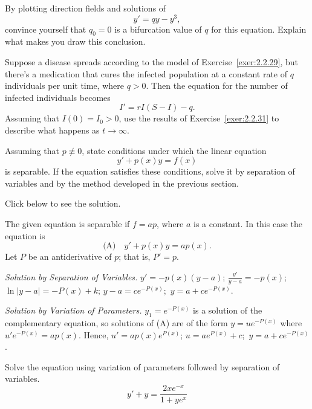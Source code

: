 \documentclass{ximera}
\begin{document}
\begin{problem}\label{exer:2.2.32}
By plotting direction fields and solutions of
$$
y'=qy-y^3,
$$
convince yourself that $q_0=0$ is a bifurcation value of $q$
for this equation. Explain what makes you draw this conclusion.

\end{problem}

\begin{problem}\label{exer:2.2.33}
Suppose a disease spreads according to the model of
Exercise~\ref{exer:2.2.29}, but
there's a medication that cures the infected population at a constant
rate of $q$ individuals per unit  time, where $q>0$.
Then
the equation for the number of infected individuals becomes
$$
I'=rI(S-I)-q.
$$
Assuming that $I(0)=I_0>0$, use the results of
Exercise~\ref{exer:2.2.31} to describe what happens as $t\to\infty$.
\end{problem}

\begin{problem}\label{exer:2.2.34}
Assuming that $p \not\equiv 0$, state conditions under which the linear
equation
$$
y'+p(x)y=f(x)
$$
is separable.  If the equation satisfies these conditions, solve it by
separation of variables and by the method developed in
the previous section.

Click below to see the solution.

\begin{solution}
    The given equation is separable if $f=ap$, where $a$ is a constant.
In this case the equation is
$$
\text{(A)}\quad y'+p(x)y=ap(x).
$$
Let $P$ be an antiderivative  of $p$; that is, $P'=p$.

\textit{Solution by Separation of Variables.} $y'=-p(x)(y-a)$;\;
$\frac{y'}{ y-a}=-p(x)$;\ $\ln|y-a|=-P(x)+k$;\;
$y-a=ce^{-P(x)}$;\ $y=a+ce^{-P(x)}$.

\textit{Solution by Variation of Parameters.} $y_1=e^{-P(x)}$
is a solution of the complementary equation, so solutions of
(A) are of the form $y=ue^{-P(x)}$ where
$u'e^{-P(x)}=ap(x)$. Hence, $u'=ap(x)e^{P(x)}$;\;
$u=ae^{P(x)}+c$;\ $y=a+ce^{-P(x)}$.
\end{solution}
\end{problem}

 \begin{problem}\label{exer:2.2.35} Solve the equation using variation of parameters followed by separation of variables.
 $$y'+y=\frac{2xe^{-x}}{1+ye^x}$$
 \end{problem}
\end{document}
